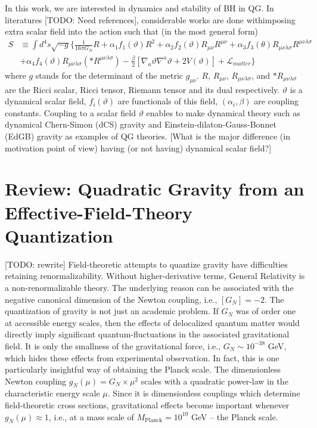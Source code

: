 \documentclass[a4paper,oneside,openany,11pt]{memoir}
\numberwithin{equation}{section} %
\newcommand{\TODO}[1]{{\color{red}[}{\color{red}TODO:} {\color{blue}#1}{\color{red}]}}
\newcommand{\NOTE}[1]{{\color{blue}[#1]}}
\begin{document}
In this work, we are interested in dynamics and stability of BH in QG.
In literatures \TODO{Need references}, considerable works are done withimposing extra 
scalar field into the action such that (in the most general form)
\begin{align}
S &\equiv \int d^4 s \sqrt{-g} \Bigg\{ \frac{1}{16 \pi G_N} R + \alpha_1 f_1 (\vartheta) R^2 + \alpha_2 f_2 (\vartheta) R_{\mu \nu} R^{\mu \nu} 
    + \alpha_3 f_3 (\theta) R_{\mu \nu \lambda \sigma} R^{\mu \nu \lambda \sigma} \nonumber \\
    &+ \alpha_4 f_4 (\vartheta) R_{\mu \nu \lambda \sigma} (*R^{\mu \nu \lambda \sigma}) - \frac{\beta}{2} [ \nabla_a \vartheta \nabla^a \vartheta
    + 2 V(\vartheta) ] + \mathcal{L}_{matter} \Bigg\}
\end{align}
where $g$ stands for the determinant of the metric $g_{\mu \nu}$. $R, \, R_{\mu \nu}, \, R_{\mu \nu \lambda \sigma}$, 
and $*R_{\mu \nu \lambda \sigma}$ are the Ricci scalar, Ricci tensor, Riemann tensor and its dual respectively. 
$\vartheta$ is a dynamical scalar field, $f_i (\vartheta)$ are functionals of this field, $(\alpha_i , \beta)$ are coupling constants.
Coupling to a scalar field $\vartheta$ enables to make dynamical theory such as dynamical Chern-Simon (dCS) gravity 
and Einstein-dilaton-Gauss-Bonnet (EdGB) gravity as examples of QG theories.
\NOTE{What is the major difference (in motivation point of view) having (or not having) dynamical scalar field?}







\section{Review: Quadratic Gravity from an Effective-Field-Theory Quantization}
\label{sec:EFT}
\TODO{rewrite}
Field-theoretic attempts to quantize gravity have difficulties
retaining renormalizability. Without higher-derivative terms, General
Relativity is a non-renormalizable theory. The underlying reason
can be associated with the negative canonical dimension of the
Newton coupling, i.e., $[G_N]=-2$. The quantization of gravity is
not just an academic problem. If $G_N$ was of order one at accessible
energy scales, then the effects of delocalized quantum matter would
directly imply significant quantum-fluctuations in the associated
gravitational field. It is only the smallness of the gravitational
force, i.e., $G_N\sim 10^{-38}$ GeV, which hides these effects from
experimental observation. In fact, this is one particularly insightful
way of obtaining the Planck scale. The dimensionless Newton coupling
$g_N(\mu) = G_N\times \mu^2$ scales with a quadratic power-law in
the characteristic energy scale $\mu$. Since it is dimensionless
couplings which determine field-theoretic cross sections, gravitational
effects become important whenever $g_N(\mu)\approx 1$, i.e., at a
mass scale of $M_\text{Planck} = 10^{19}$ GeV -- the Planck scale.
\\
\end{document}
